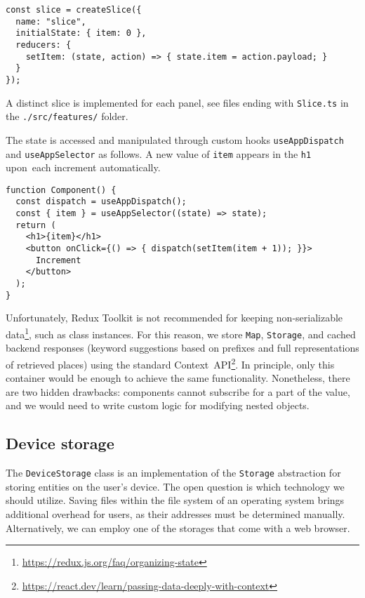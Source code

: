 \begin{verbatim}
const slice = createSlice({
  name: "slice",
  initialState: { item: 0 },
  reducers: {
    setItem: (state, action) => { state.item = action.payload; }
  }
});
\end{verbatim}

A distinct slice is implemented for each panel, see files ending with \texttt{Slice.ts} in the \texttt{./src/features/} folder.

The state is accessed and manipulated through custom hooks \texttt{useAppDispatch} and \texttt{useAppSelector} as follows. A new value of \texttt{item} appears in the \texttt{h1} upon~each increment automatically.

\begin{verbatim}
function Component() {
  const dispatch = useAppDispatch();
  const { item } = useAppSelector((state) => state);
  return (
    <h1>{item}</h1>
    <button onClick={() => { dispatch(setItem(item + 1)); }}>
      Increment
    </button>
  );
}
\end{verbatim}

Unfortunately, Redux Toolkit is not recommended for keeping non-serializable data\footnote{\href{https://redux.js.org/faq/organizing-state}{https://redux.js.org/faq/organizing-state}}, such as class instances. For this reason, we store \texttt{Map}, \texttt{Storage}, and cached backend responses (keyword suggestions based on prefixes and full rep\-re\-sen\-ta\-tions of retrieved places) using the standard Context~API\footnote{\href{https://react.dev/learn/passing-data-deeply-with-context}{https://react.dev/learn/passing-data-deeply-with-context}}. In principle, only this container would be enough to achieve the same functionality. Nonetheless, there are two hidden drawbacks: components cannot subscribe for a part of the value, and we would need to write custom logic for modifying nested objects.

\subsection{Device storage}


The \texttt{DeviceStorage} class is an implementation of the \texttt{Storage} abstraction for storing entities on the user's device. The open question is which technology we should utilize. Saving files within the file system of an operating system brings additional overhead for users, as their addresses must be determined manually. Alternatively, we can employ one of the storages that come with a web browser.

